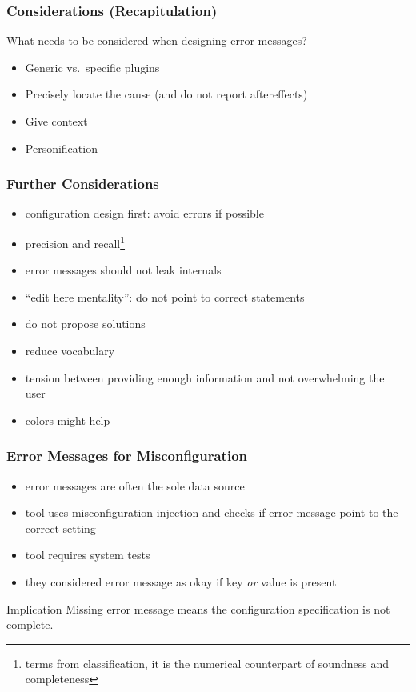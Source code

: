 \begin{frame}
	\frametitle{Considerations (Recapitulation)}

	\begin{task}
	What needs to be considered when designing error messages?
	\end{task}

	\begin{itemize} %
	\item Generic vs.\ specific plugins
	\item Precisely locate the cause (and do not report aftereffects)
	\item Give context
	\item Personification~\cite{lee2011personifying}
	\end{itemize}
\end{frame}

\begin{frame}
	\frametitle{Further Considerations}

	\begin{itemize}[<+-| alert@+>]
	\item configuration design first: avoid errors if possible
	\item precision and recall\footnote{terms from classification, it is the numerical counterpart of soundness and completeness}~\cite{wrenn2017error}
	\item error messages should not leak internals~\cite{brown1983error}
	\item ``edit here mentality'': do not point to correct statements~\cite{marceau2011mind}
	\item do not propose solutions~\cite{marceau2011mind}
	\item reduce vocabulary~\cite{marceau2011mind}
	\item tension between providing enough information and not overwhelming the user~\cite{wrenn2017error}
	\item colors might help~\cite{wrenn2017error}
	\end{itemize}
\end{frame}

\begin{frame}
	\frametitle{Error Messages for Misconfiguration~\cite{zhang2015proactive}}

	\begin{itemize}[<+-| alert@+>]
	\item error messages are often the sole data source
	\item tool uses misconfiguration injection and checks if error message point to the correct setting
	\item tool requires system tests
	\item they considered error message as okay if key \emph{or} value is present
	\end{itemize}

	\begin{alertblock}{Implication}
	Missing error message means the configuration specification is not complete.
	\end{alertblock}
\end{frame}

